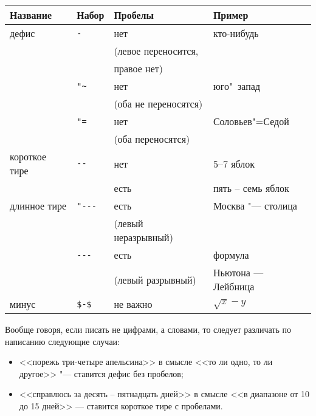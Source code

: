 \documentclass{article}
\begin{document}
\begin{center}
\begin{tabular}{|l|l|l|l|}
\hline
\textbf{Название}&\textbf{Набор}&\textbf{Пробелы}     &\textbf{Пример}       \\ \hline
дефис            & \verb"-"     & нет                 & кто-нибудь           \\
                 &              & (левое переносится, &                      \\
                 &              & правое нет)         &                      \\ \cline{2-4}
                 & \verb|"~|    & нет                 & юго"~запад           \\
                 &              & (оба не переносятся)&                      \\ \cline{2-4}
                 & \verb|"=|    & нет                 & Соловьев"=Седой      \\
                 &              & (оба переносятся)   &                      \\ \hline
короткое тире    & \verb"--"    & нет                 & 5--7 яблок           \\
                 &              & есть                & пять -- семь яблок   \\ \hline
длинное тире     & \verb!"---!  & есть                & Москва "--- столица  \\
                 &              &(левый неразрывный)  &                      \\ \cline{2-4}
                 & \verb!---!   & есть                & формула              \\
                 &              &(левый разрывный)    & Ньютона --- Лейбница \\ \hline
минус            & \verb"$-$"   & не важно            & $\sqrt{x} - y$       \\ \hline
\end{tabular}
\end{center}


Вообще говоря, если писать не цифрами, а словами, то следует различать по написанию следующие случаи:
\begin{itemize}
\item <<порежь три-четыре апельсина>> в смысле <<то ли одно, то ли другое>> "--- ставится дефис без пробелов;
\item <<справлюсь за десять -- пятнадцать дней>> в смысле <<в диапазоне от 10 до 15 дней>> --- ставится короткое тире с пробелами.
\end{itemize}
\end{document}

